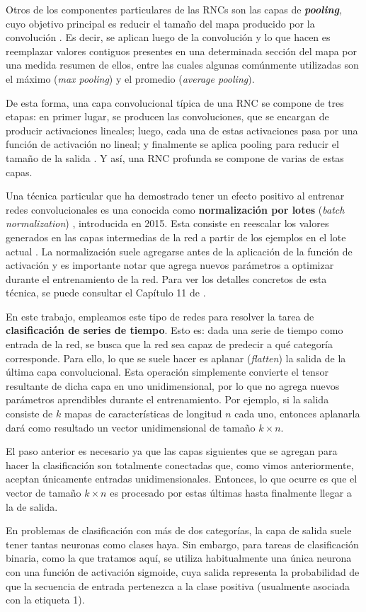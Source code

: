 \documentclass[../../main.tex]{subfiles}
\begin{document}
Otros de los componentes particulares de las RNCs son las capas de
\textbf{\textit{pooling}}, cuyo objetivo principal es reducir el tamaño del mapa producido
por la convolución \cite{hands-on-ML-sklearn-tf}. Es decir, se aplican luego de la
convolución y lo que hacen es reemplazar valores contiguos presentes en una determinada
sección del mapa por una medida resumen de ellos, entre las cuales algunas comúnmente
utilizadas son el máximo (\textit{max pooling}) y el promedio (\textit{average pooling}).

De esta forma, una capa convolucional típica de una RNC se compone de tres etapas: en
primer lugar, se producen las convoluciones, que se encargan de producir activaciones
lineales; luego, cada una de estas activaciones pasa por una función de activación no
lineal; y finalmente se aplica pooling para reducir el tamaño de la salida
\cite{deep-learning}. Y así, una RNC profunda se compone de varias de estas capas.

\medskip
Una técnica particular que ha demostrado tener un efecto positivo al entrenar redes
convolucionales es una conocida como \textbf{normalización por lotes} (\textit{batch
normalization}) \cite{batch-norm} \cite{deep-learning} \cite{hands-on-ML-sklearn-tf},
introducida en 2015. Esta consiste en reescalar los valores generados en las capas
intermedias de la red a partir de los ejemplos en el lote actual
\cite{ai-a-modern-approach}. La normalización suele agregarse antes de la aplicación de la
función de activación y es importante notar que agrega nuevos parámetros a optimizar
durante el entrenamiento de la red. Para ver los detalles concretos de esta técnica, se
puede consultar el Capítulo 11 de \cite{hands-on-ML-sklearn-tf}.

\bigskip
En este trabajo, empleamos este tipo de redes para resolver la tarea de
\textbf{clasificación de series de tiempo}. Esto es: dada una serie de tiempo como entrada
de la red, se busca que la red sea capaz de predecir a qué categoría corresponde. Para
ello, lo que se suele hacer es aplanar (\textit{flatten}) la salida de la última capa
convolucional. Esta operación simplemente convierte el tensor resultante de dicha capa en
uno unidimensional, por lo que no agrega nuevos parámetros aprendibles durante el
entrenamiento. Por ejemplo, si la salida consiste de \(k\) mapas de características de
longitud \(n\) cada uno, entonces aplanarla dará como resultado un vector unidimensional
de tamaño \(k \times n\).

El paso anterior es necesario ya que las capas siguientes que se agregan para hacer la
clasificación son totalmente conectadas que, como vimos anteriormente, aceptan únicamente
entradas unidimensionales. Entonces, lo que ocurre es que el vector de tamaño \(k \times
n\) es procesado por estas últimas hasta finalmente llegar a la de salida.

En problemas de clasificación con más de dos categorías, la capa de salida suele tener
tantas neuronas como clases haya. Sin embargo, para tareas de clasificación binaria, como
la que tratamos aquí, se utiliza habitualmente una única neurona con una función de
activación sigmoide, cuya salida representa la probabilidad de que la secuencia de entrada
pertenezca a la clase positiva (usualmente asociada con la etiqueta 1).
\end{document}

